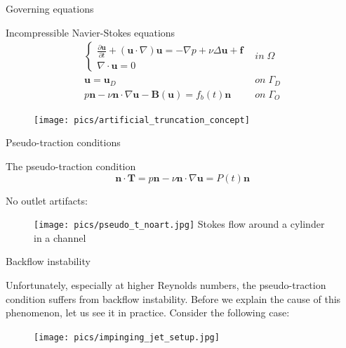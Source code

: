\documentclass{beamer}
\begin{document}
\begin{frame}{Governing equations}

	\begin{block}{Incompressible Navier-Stokes equations}
		\begin{equation}
			\begin{array}{cl}\left\{
				\begin{array}{c}
					\frac{\partial\mathbf{u}}{\partial t}+\left(\mathbf{u}\cdot\nabla\right)\mathbf{u}=-\nabla p+\nu\Delta\mathbf{u}+\mathbf{f}\\
					\nabla\cdot\mathbf{u}=0
				\end{array}\right. & in\;\Omega\\
			\mathbf{u}=\mathbf{u}_{D} & on\;\Gamma_{D}\\
			p\mathbf{n}-\nu\mathbf{n}\cdot\nabla\mathbf{u}-\mathbf{B}\left(\mathbf{u}\right)=f_{b}\left(t\right)\mathbf{n} & on\;\Gamma_{O}
			\end{array}
		\end{equation}
	\end{block}
	\begin{figure}
		\texttt{[image: pics/artificial\_truncation\_concept]}
	\end{figure}

\end{frame}

\begin{frame}{Pseudo-traction conditions}

	\begin{block}{The pseudo-traction condition}
		\begin{equation}
			\mathbf{n}\cdot\mathbf{T}=p\mathbf{n}-\nu\mathbf{n}\cdot\nabla\mathbf{u}=P\left(t\right)\mathbf{n}
		\end{equation}
	\end{block}
	No outlet artifacts:
	\begin{figure}
		\texttt{[image: pics/pseudo\_t\_noart.jpg]}
		Stokes flow around a cylinder in a channel
	\end{figure}

\end{frame}

\begin{frame}{Backflow instability}

	Unfortunately, especially at higher Reynolds numbers, the pseudo-traction condition suffers from backflow instability. Before we explain the cause of this phenomenon, let us see it in practice. Consider the following case:
	\begin{figure}
		\texttt{[image: pics/impinging\_jet\_setup.jpg]}
	\end{figure}
	
\end{frame}
\end{document}
